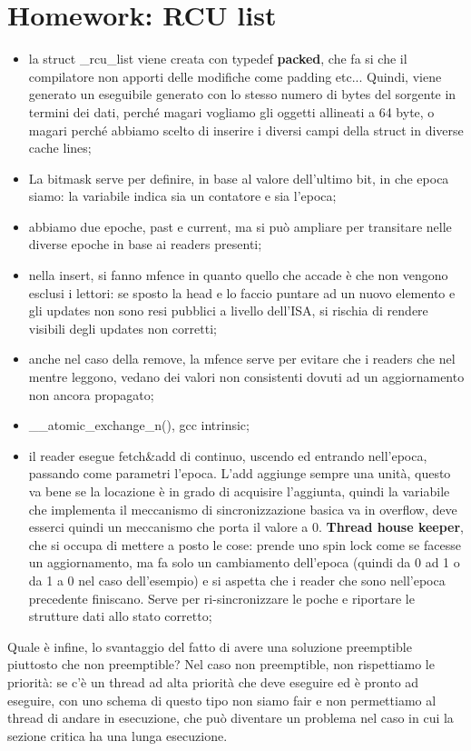 \documentclass[12pt, oneside]{extbook}
\begin{document}
\section*{Homework: RCU list}
\begin{itemize}
\item la struct \_rcu\_list viene creata con typedef \textbf{packed}, che fa si che il compilatore non apporti delle modifiche come padding etc... Quindi, viene generato un eseguibile generato con lo stesso numero di bytes del sorgente in termini dei dati, perché magari vogliamo gli oggetti allineati a 64 byte, o magari perché abbiamo scelto di inserire i diversi campi della struct in diverse cache lines;
\item La bitmask serve per definire, in base al valore dell'ultimo bit, in che epoca siamo: la variabile indica sia un contatore e sia l'epoca;
\item abbiamo due epoche, past e current, ma si può ampliare per transitare nelle diverse epoche in base ai readers presenti;
\item nella insert, si fanno mfence in quanto quello che accade è che non vengono esclusi i lettori: se sposto la head e lo faccio puntare ad un nuovo elemento e gli updates non sono resi pubblici a livello dell'ISA, si rischia di rendere visibili degli updates non corretti;
\item anche nel caso della remove, la mfence serve per evitare che i readers che nel mentre leggono, vedano dei valori non consistenti dovuti ad un aggiornamento non ancora propagato;
\item \_\_atomic\_exchange\_n(), gcc intrinsic;
\item il reader esegue fetch\&add di continuo, uscendo ed entrando nell'epoca, passando come parametri l'epoca. L'add aggiunge sempre una unità, questo va bene se la locazione è in grado di acquisire l'aggiunta, quindi la variabile che implementa il meccanismo di sincronizzazione basica va in overflow, deve esserci quindi un meccanismo che porta il valore a 0. \textbf{Thread house keeper}, che si occupa di mettere a posto le cose: prende uno spin lock come se facesse un aggiornamento, ma fa solo un cambiamento dell'epoca (quindi da 0 ad 1 o da 1 a 0 nel caso dell'esempio) e si aspetta che i reader che sono nell'epoca precedente finiscano. Serve per ri-sincronizzare le poche e riportare le strutture dati allo stato corretto;
\end{itemize}
Quale è infine, lo svantaggio del fatto di avere una soluzione preemptible piuttosto che non preemptible? Nel caso non preemptible, non rispettiamo le priorità: se c'è un thread ad alta priorità che deve eseguire ed è pronto ad eseguire, con uno schema di questo tipo non siamo fair e non permettiamo al thread di andare in esecuzione, che può diventare un problema nel caso in cui la sezione critica ha una lunga esecuzione.
\end{document}

